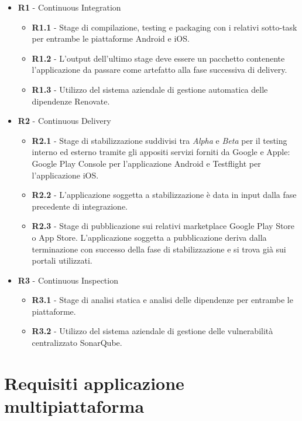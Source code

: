 \begin{itemize}
    \item \textbf{R1} - Continuous Integration
    \begin{itemize}
        \item \textbf{R1.1} - Stage di compilazione, testing e packaging con i relativi sotto-task per entrambe le piattaforme Android e iOS.
        \item \textbf{R1.2} - L'output dell'ultimo stage deve essere un pacchetto contenente l'applicazione da passare come artefatto alla fase successiva di delivery.
        \item \textbf{R1.3} - Utilizzo del sistema aziendale di gestione automatica delle dipendenze Renovate.
    \end{itemize}
    \item \textbf{R2} - Continuous Delivery
    \begin{itemize}
        \item \textbf{R2.1} - Stage di stabilizzazione suddivisi tra \textit{Alpha} e \textit{Beta} per il testing interno ed esterno tramite gli appositi servizi forniti da Google e Apple: Google Play Console per l'applicazione Android e Testflight per l'applicazione iOS.
        \item \textbf{R2.2} - L'applicazione soggetta a stabilizzazione è data in input dalla fase precedente di integrazione.
        \item \textbf{R2.3} - Stage di pubblicazione sui relativi marketplace Google Play Store o App Store. L'applicazione soggetta a pubblicazione deriva dalla terminazione con successo della fase di stabilizzazione e si trova già sui portali utilizzati.
    \end{itemize}
    \item \textbf{R3} - Continuous Inspection
    \begin{itemize}
        \item \textbf{R3.1} - Stage di analisi statica e analisi delle dipendenze per entrambe le piattaforme.
        \item \textbf{R3.2} - Utilizzo del sistema aziendale di gestione delle vulnerabilità centralizzato SonarQube.
    \end{itemize}
\end{itemize}

\section{Requisiti applicazione multipiattaforma}
